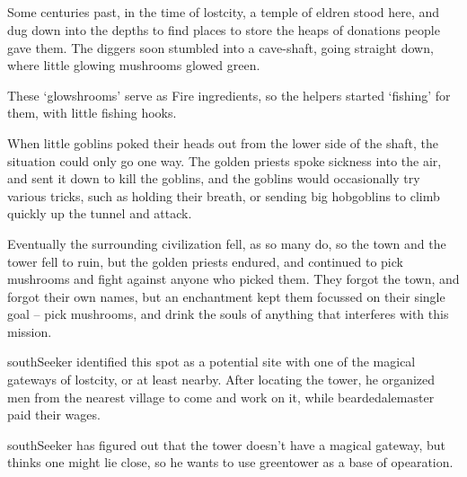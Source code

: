 \subsection{}
\label{green_tower}


\begin{exampletext}
  Some centuries past, in the time of \gls{lostcity}, a temple of \gls{eldren} stood here, and dug down into the depths to find places to store the heaps of donations people gave them.
  The diggers soon stumbled into a cave-shaft, going straight down, where little glowing mushrooms glowed green.%

  These `glowshrooms' serve as Fire \glspl{ingredient}, so the \glspl{helper} started `fishing' for them, with little fishing hooks.

  When little goblins poked their heads out from the lower side of the shaft, the situation could only go one way.
  The golden priests spoke sickness into the air, and sent it down to kill the goblins, and the goblins would occasionally try various tricks, such as holding their breath, or sending big hobgoblins to climb quickly up the tunnel and attack.

  Eventually the surrounding civilization fell, as so many do, so the town and the tower fell to ruin, but the golden priests endured, and continued to pick mushrooms and fight against anyone who picked them.
  They forgot the town, and forgot their own names, but an enchantment kept them focussed on their single goal -- pick mushrooms, and drink the souls of anything that interferes with this mission.
\end{exampletext}

\begin{exampletext}
  \Gls{southSeeker} identified this spot as a potential site with one of the magical gateways of \gls{lostcity}, or at least nearby.
  After locating the tower, he organized men from the nearest \gls{village} to come and work on it, while \gls{beardedalemaster} paid their wages.

  \Gls{southSeeker} has figured out that the tower doesn't have a magical gateway, but thinks one might lie close, so he wants to use \gls{greentower} as a base of opearation.
\end{exampletext}

